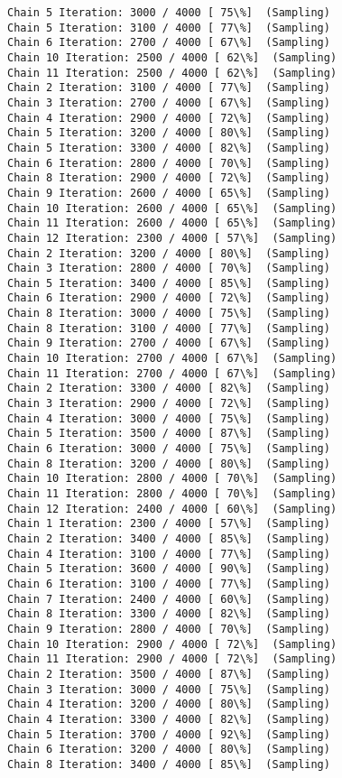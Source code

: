 \documentclass[11pt]{article}
\begin{document}
\begin{Verbatim}[commandchars=\\\{\}]
Chain 5 Iteration: 3000 / 4000 [ 75\%]  (Sampling)
Chain 5 Iteration: 3100 / 4000 [ 77\%]  (Sampling)
Chain 6 Iteration: 2700 / 4000 [ 67\%]  (Sampling)
Chain 10 Iteration: 2500 / 4000 [ 62\%]  (Sampling)
Chain 11 Iteration: 2500 / 4000 [ 62\%]  (Sampling)
Chain 2 Iteration: 3100 / 4000 [ 77\%]  (Sampling)
Chain 3 Iteration: 2700 / 4000 [ 67\%]  (Sampling)
Chain 4 Iteration: 2900 / 4000 [ 72\%]  (Sampling)
Chain 5 Iteration: 3200 / 4000 [ 80\%]  (Sampling)
Chain 5 Iteration: 3300 / 4000 [ 82\%]  (Sampling)
Chain 6 Iteration: 2800 / 4000 [ 70\%]  (Sampling)
Chain 8 Iteration: 2900 / 4000 [ 72\%]  (Sampling)
Chain 9 Iteration: 2600 / 4000 [ 65\%]  (Sampling)
Chain 10 Iteration: 2600 / 4000 [ 65\%]  (Sampling)
Chain 11 Iteration: 2600 / 4000 [ 65\%]  (Sampling)
Chain 12 Iteration: 2300 / 4000 [ 57\%]  (Sampling)
Chain 2 Iteration: 3200 / 4000 [ 80\%]  (Sampling)
Chain 3 Iteration: 2800 / 4000 [ 70\%]  (Sampling)
Chain 5 Iteration: 3400 / 4000 [ 85\%]  (Sampling)
Chain 6 Iteration: 2900 / 4000 [ 72\%]  (Sampling)
Chain 8 Iteration: 3000 / 4000 [ 75\%]  (Sampling)
Chain 8 Iteration: 3100 / 4000 [ 77\%]  (Sampling)
Chain 9 Iteration: 2700 / 4000 [ 67\%]  (Sampling)
Chain 10 Iteration: 2700 / 4000 [ 67\%]  (Sampling)
Chain 11 Iteration: 2700 / 4000 [ 67\%]  (Sampling)
Chain 2 Iteration: 3300 / 4000 [ 82\%]  (Sampling)
Chain 3 Iteration: 2900 / 4000 [ 72\%]  (Sampling)
Chain 4 Iteration: 3000 / 4000 [ 75\%]  (Sampling)
Chain 5 Iteration: 3500 / 4000 [ 87\%]  (Sampling)
Chain 6 Iteration: 3000 / 4000 [ 75\%]  (Sampling)
Chain 8 Iteration: 3200 / 4000 [ 80\%]  (Sampling)
Chain 10 Iteration: 2800 / 4000 [ 70\%]  (Sampling)
Chain 11 Iteration: 2800 / 4000 [ 70\%]  (Sampling)
Chain 12 Iteration: 2400 / 4000 [ 60\%]  (Sampling)
Chain 1 Iteration: 2300 / 4000 [ 57\%]  (Sampling)
Chain 2 Iteration: 3400 / 4000 [ 85\%]  (Sampling)
Chain 4 Iteration: 3100 / 4000 [ 77\%]  (Sampling)
Chain 5 Iteration: 3600 / 4000 [ 90\%]  (Sampling)
Chain 6 Iteration: 3100 / 4000 [ 77\%]  (Sampling)
Chain 7 Iteration: 2400 / 4000 [ 60\%]  (Sampling)
Chain 8 Iteration: 3300 / 4000 [ 82\%]  (Sampling)
Chain 9 Iteration: 2800 / 4000 [ 70\%]  (Sampling)
Chain 10 Iteration: 2900 / 4000 [ 72\%]  (Sampling)
Chain 11 Iteration: 2900 / 4000 [ 72\%]  (Sampling)
Chain 2 Iteration: 3500 / 4000 [ 87\%]  (Sampling)
Chain 3 Iteration: 3000 / 4000 [ 75\%]  (Sampling)
Chain 4 Iteration: 3200 / 4000 [ 80\%]  (Sampling)
Chain 4 Iteration: 3300 / 4000 [ 82\%]  (Sampling)
Chain 5 Iteration: 3700 / 4000 [ 92\%]  (Sampling)
Chain 6 Iteration: 3200 / 4000 [ 80\%]  (Sampling)
Chain 8 Iteration: 3400 / 4000 [ 85\%]  (Sampling)

\end{Verbatim}
\end{document}

